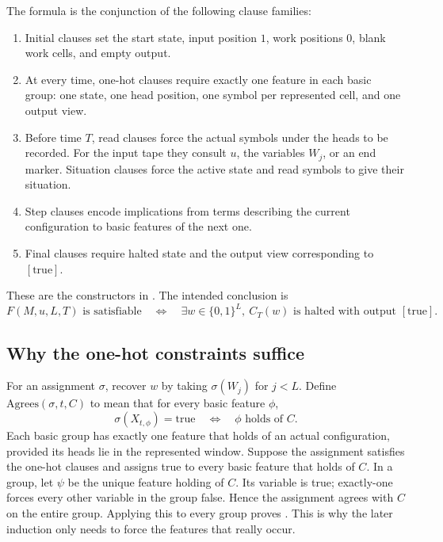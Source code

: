 The formula is the conjunction of the following clause families:
\begin{enumerate}
\item Initial clauses set the start state, input position $1$, work positions $0$,
      blank work cells, and empty output.
\item At every time, one-hot clauses require exactly one feature in each basic group:
      one state, one head position, one symbol per represented cell, and one output view.
\item Before time $T$, read clauses force the actual symbols under the heads to be
      recorded. For the input tape they consult $u$, the variables $W_j$, or an end marker.
      Situation clauses force the active state and read symbols to give their situation.
\item Step clauses encode implications from terms describing the current configuration
      to basic features of the next one.
\item Final clauses require halted state and the output view corresponding to $[\mathrm{true}]$.
\end{enumerate}
These are the constructors in
.
The intended conclusion is
\begin{equation}\label{eq:tableau}
F(M,u,L,T)\text{ is satisfiable}
\quad\Longleftrightarrow\quad
\exists w\in\{0,1\}^{L},\ C_T(w)\text{ is halted with output }[\mathrm{true}].
\end{equation}

\subsection{Why the one-hot constraints suffice}

For an assignment $\sigma$, recover $w$ by taking $\sigma(W_j)$ for $j<L$.
Define $\mathrm{Agrees}(\sigma,t,C)$ to mean that for every basic feature $\phi$,
\[
 \sigma(X_{t,\phi})=\mathrm{true}\quad\Longleftrightarrow\quad \phi\text{ holds of }C.
\]
Each basic group has exactly one feature that holds of an actual configuration,
provided its heads lie in the represented window. Suppose the assignment satisfies
the one-hot clauses and assigns true to every basic feature that holds of $C$.
In a group, let $\psi$ be the unique feature holding of $C$. Its variable is true;
exactly-one forces every other variable in the group false. Hence the assignment
agrees with $C$ on the entire group. Applying this to every group proves
.
This is why the later induction only needs to force the features that really occur.

